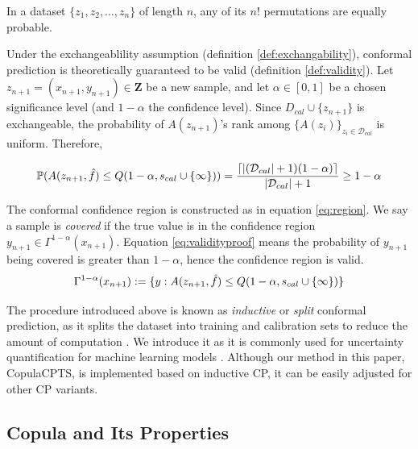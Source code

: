 \begin{definition}
In a dataset $\{z_1, z_2, \ldots, z_n\}$ of length  $n$, any of its $n$! permutations are equally probable. 
\label{def:exchangability}
\end{definition}

Under the exchangeablility assumption (definition \autoref{def:exchangability}), conformal prediction is theoretically guaranteed to be valid (definition \ref{def:validity}). Let $z_{n+1} = (x_{n+1}, y_{n+1}) \in \mathbf{Z}$ be a new sample, and let $\alpha \in [0,1]$ be a chosen significance level (and $1-\alpha$ the confidence level). Since $D_{cal} \cup \{z_{n+1}\}$ is exchangeable, the probability of $A(z_{n+1})$'s rank among $\{A(z_{i})\}_{z_{i} \in \mathcal{D}_{cal}}$ is uniform. Therefore,
                  
\begin{equation}
{\mathbb{P}}(A(z_{n+1}, \hat{f}) \leq Q(1-\alpha, s_{cal}\cup \{\infty\})) = \frac{ \lceil |(\mathcal{D}_{cal}| +1)(1-\alpha) \rceil}{|\mathcal{D}_{cal}|+1} \geq 1-\alpha   \label{eq:validityproof}
\end{equation}

The conformal confidence region is constructed as in equation \ref{eq:region}. We say a sample is \textit{covered} if the true value is in the confidence region $y_{n+1} \in \Gamma^{1-\alpha}(x_{n+1})$. Equation \ref{eq:validityproof} means the probability of $y_{n+1}$ being covered is greater than $1-\alpha$, hence the confidence region is valid.
\begin{equation}
    \Gamma^{1-\alpha}(x_{n+1}) := \{ y : A(z_{n+1}, \hat{f}) \leq Q(1-\alpha, s_{cal}\cup \{\infty\})\}
    \label{eq:region}
\end{equation}

The procedure introduced above is known as \textit{inductive} or \textit{split} conformal prediction, as it splits the dataset into training and calibration sets to reduce the amount of computation \cite{vovk2005algorithmic,lei2012distribution}. We introduce it as it is commonly used for uncertainty quantification for machine learning models \cite{papadopoulos2008inductive}. Although our method in this paper, CopulaCPTS, is implemented based on inductive CP, it can be easily adjusted for other CP variants.


\subsection{Copula and Its Properties}

